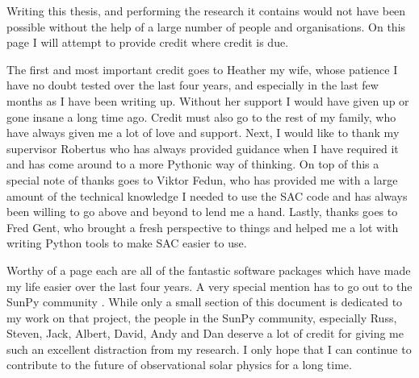 
\begin{acknowledgements}      

Writing this thesis, and performing the research it contains would not have been possible without the help of a large number of people and organisations.
On this page I will attempt to provide credit where credit is due.

The first and most important credit goes to Heather my wife, whose patience I have no doubt tested over the last four years, and especially in the last few months as I have been writing up.
Without her support I would have given up or gone insane a long time ago.
Credit must also go to the rest of my family, who have always given me a lot of love and support.
Next, I would like to thank my supervisor Robertus who has always provided guidance when I have required it and has come around to a more Pythonic way of thinking.
On top of this a special note of thanks goes to Viktor Fedun, who has provided me with a large amount of the technical knowledge I needed to use the SAC code and has always been willing to go above and beyond to lend me a hand.
Lastly, thanks goes to Fred Gent, who brought a fresh perspective to things and helped me a lot with writing Python tools to make SAC easier to use.

Worthy of a page each are all of the fantastic software packages which have made my life easier over the last four years.
A very special mention has to go out to the SunPy community \citep{thesunpycommunity2015a}.
While only a small section of this document is dedicated to my work on that project, the people in the SunPy community, especially Russ, Steven, Jack, Albert, David, Andy and Dan deserve a lot of credit for giving me such an excellent distraction from my research.
I only hope that I can continue to contribute to the future of observational solar physics for a long time.


\end{acknowledgements}
